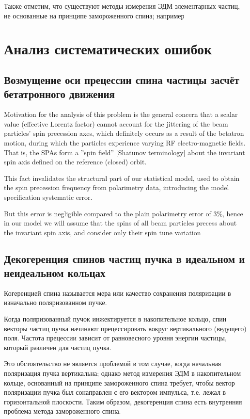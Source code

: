 Также отметим, что существуют методы измерения ЭДМ элементарных частиц, не основанные на принципе замороженного спина; например~\cite{COSY:SpinTuneMapping}

\section{Анализ систематических ошибок} \label{sec:systematic_error}
\subsection{Возмущение оси прецессии спина частицы засчёт бетатронного движения}
Motivation for the analysis of this problem is the general concern that a scalar value (effective Lorentz factor) cannot account for the jittering of the beam particles' spin precession axes, which definitely occurs as a result of the betatron motion, during which the particles experience varying RF electro-magnetic fields. That is, the SPAs form a ''spin field'' [Shatunov terminology] about the invariant spin axis defined on the reference (closed) orbit.

This fact invalidates the structural part of our statistical model, used to obtain the spin precession frequency from polarimetry data, introducing the model specification systematic error.

But this error is negligible compared to the plain polarimetry error of 3\%, hence in our model we will assume that the spins of all beam particles precess about the invariant spin axis, and consider only their spin tune variation 
\subsection{Декогеренция спинов частиц пучка в идеальном и неидеальном кольцах}
Когеренцией спина называется мера или качество сохранения поляризации
в изначально поляризованном пучке.~\cite[стр.~205]{Eremey:Thesis}

Когда поляризованный пучок инжектируется в накопительное кольцо, спин
векторы частиц пучка начинают прецессировать вокруг вертикального
(ведущего) поля. Частота прецессии зависит от равновесного уровня
энергии частицы, который различен для частиц пучка.

Это обстоятельство не является проблемой в том случае, когда начальная
поляризация пучка вертикальна; однако метод измерения ЭДМ в
накопительном кольце, основанный
на принципе замороженного спина требует, чтобы вектор поляризации
пучка был сонаправлен с его вектором импульса, т.е. лежал в
горизонтальной плоскости. Таким образом, декогеренция спина есть
внутренняя проблема метода замороженного спина.
